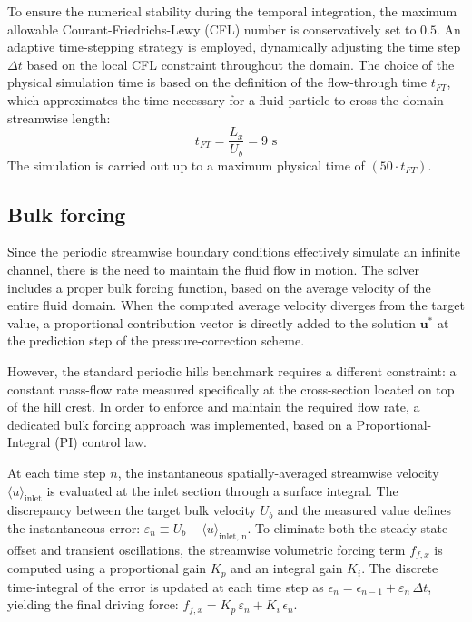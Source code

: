 \documentclass[12pt, a4paper, twoside, openright]{book}
\begin{document}
To ensure the numerical stability during the temporal integration, the maximum allowable Courant-Friedrichs-Lewy (CFL) number is conservatively set to $0.5$. An adaptive time-stepping strategy is employed, dynamically adjusting the time step $\Delta t$ based on the local CFL constraint throughout the domain. The choice of the physical simulation time is based on the definition of the flow-through time $t_{FT}$, which approximates the time necessary for a fluid particle to cross the domain streamwise length:
\begin{equation}
	t_{FT} = \frac{L_x}{U_b} = 9 \text{ s}
\end{equation}
The simulation is carried out up to a maximum physical time of $(50 \cdot t_{FT})$.

\subsection{Bulk forcing}
\label{sec:bulk-forcing}
Since the periodic streamwise boundary conditions effectively simulate an infinite channel, there is the need to maintain the fluid flow in motion. The solver includes a proper bulk forcing function, based on the average velocity of the entire fluid domain. When the computed average velocity diverges from the target value, a proportional contribution vector is directly added to the solution $\bm{u}^*$ at the prediction step of the pressure-correction scheme.

However, the standard periodic hills benchmark requires a different constraint: a constant mass-flow rate measured specifically at the cross-section located on top of the hill crest. In order to enforce and maintain the required flow rate, a dedicated bulk forcing approach was implemented, based on a Proportional-Integral (PI) control law.

At each time step $n$, the instantaneous spatially-averaged streamwise velocity $\langle u \rangle_{\text{inlet}}$ is evaluated at the inlet section through a surface integral. The discrepancy between the target bulk velocity $U_b$ and the measured value defines the instantaneous error: $\varepsilon_n \equiv U_b - \langle u \rangle_{\text{inlet, n}}$. To eliminate both the steady-state offset and transient oscillations, the streamwise volumetric forcing term $f_{f,x}$ is computed using a proportional gain $K_p$ and an integral gain $K_i$. The discrete time-integral of the error is updated at each time step as $\epsilon_n = \epsilon_{n-1} + \varepsilon_n \, \Delta t$, yielding the final driving force:
$f_{f,x} = K_p \, \varepsilon_n + K_i \, \epsilon_n$.
\end{document}
